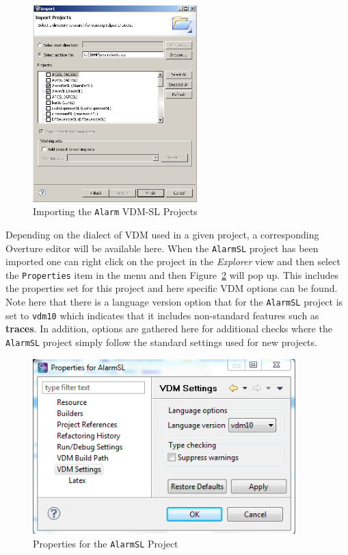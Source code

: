 %
\begin{figure}[!htb]
\begin{center}
  \includegraphics[width=2.5in]{figures/importalarm}
  \caption[labelInTOC]{Importing the \texttt{Alarm} VDM-SL Projects}
  \label{fig:importalarm}
\end{center}
\end{figure}
%
Depending on the dialect of VDM used in a given project, a corresponding Overture editor will be available here. When the \texttt{AlarmSL} project has been imported one can right click on the
project in the \emph{Explorer} view and then select the \texttt{Properties} item in the menu and then
Figure~\ref{fig:settings} will pop up. This includes the properties set for this project and here specific VDM options can be found. Note here that there is a language version option that for the \texttt{AlarmSL} project is set to \texttt{vdm10} which indicates that it includes non-standard features such as {\bf\ttfamily traces}. In addition, options are gathered here for additional checks where the \texttt{AlarmSL} project simply follow the standard settings used for new projects.
%
\begin{figure}[!htb]
\begin{center}
  \includegraphics[width=4.0in]{figures/settings}
  \caption[labelInTOC]{Properties for the \texttt{AlarmSL} Project}
  \label{fig:settings}
\end{center}
\end{figure}
